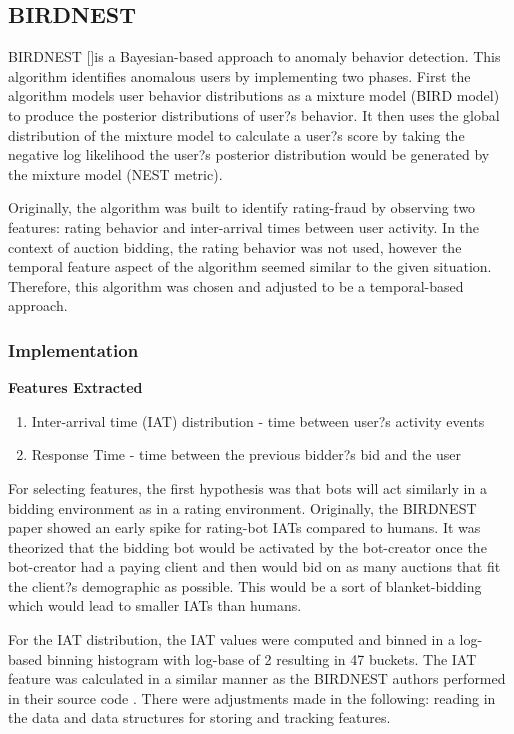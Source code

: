 \documentclass{article} %
\begin{document}
\subsection{BIRDNEST}

\quad BIRDNEST [\cite{birdnest}]is a Bayesian-based approach to anomaly behavior detection. This algorithm identifies anomalous users by implementing two phases. First the algorithm models user behavior distributions as a mixture model (BIRD model) to produce the posterior distributions of user?s behavior. It then uses the global distribution of the mixture model to calculate a user?s score by taking the negative log likelihood the user?s posterior distribution would be generated by the mixture model (NEST metric).

\quad Originally, the algorithm was built to identify rating-fraud by observing two features: rating behavior and inter-arrival times between user activity. In the context of auction bidding, the rating behavior was not used, however the temporal feature aspect of the algorithm seemed similar to the given situation. Therefore, this algorithm was chosen and adjusted to be a temporal-based approach.
	
\subsubsection{Implementation}

\textbf{Features Extracted} 

\begin{enumerate}
\item Inter-arrival time (IAT) distribution - time between user?s activity events
\item Response Time - time between the previous bidder?s bid and the user
\end{enumerate}

For selecting features, the first hypothesis was that bots will act similarly in a bidding environment as in a rating environment. Originally, the BIRDNEST paper showed an early spike for rating-bot IATs compared to humans. It was theorized that the bidding bot would be activated by the bot-creator once the bot-creator had a paying client and then would bid on as many auctions that fit the client?s demographic as possible. This would be a sort of blanket-bidding which would lead to smaller IATs than humans.

For the IAT distribution, the IAT values were computed and binned in a log-based binning histogram with log-base of 2 resulting in 47 buckets. The IAT feature was calculated in a similar manner as the BIRDNEST authors performed in their source code \cite{birdnest_code}. There were adjustments made in the following: reading in the data and data structures for storing and tracking features.
\end{document}
